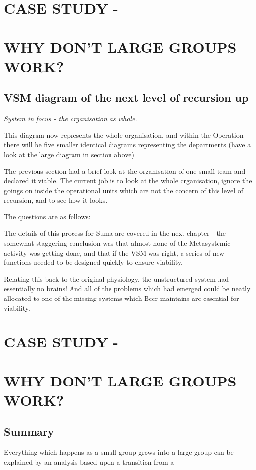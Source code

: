 \section*{CASE STUDY -}

\section*{WHY DON'T LARGE GROUPS WORK?}

\subsection*{VSM diagram of the next level of recursion up}
\textit{System in focus - the organisation as whole.}

This diagram now represents the whole organisation, and within the Operation there will be five smaller identical diagrams representing the departments (\href{https://vsmg.lrc.org.uk/screen.php?page=recursion#largevsm}{have a look at the large diagram in section above})

The previous section had a brief look at the organisation of one small team and declared it viable. The current job is to look at the whole organisation, ignore the goings on inside the operational units which are not the concern of this level of recursion, and to see how it looks.

The questions are as follows:

The details of this process for Suma are covered in the next chapter - the somewhat staggering conclusion was that almost none of the Metasystemic activity was getting done, and that if the VSM was right, a series of new functions needed to be designed quickly to ensure viability.

Relating this back to the original physiology, the unstructured system had essentially no brains! And all of the problems which had emerged could be neatly allocated to one of the missing systems which Beer maintains are essential for viability.

\section*{CASE STUDY -}

\section*{WHY DON'T LARGE GROUPS WORK?}

\subsection*{Summary}
Everything which happens as a small group grows into a large group can be explained by an analysis based upon a transition from a

